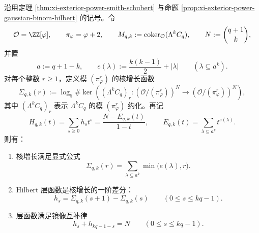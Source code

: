 \begin{theorem}\label{thm:derived-exterior-power-kernel-growth-hilbert-mirror}
沿用定理 \ref{thm:xi-exterior-power-smith-schubert} 与命题 \ref{prop:xi-exterior-power-gaussian-binom-hilbert} 的记号。令
\[
\mathcal O=\ZZ[\varphi],
\qquad
\pi_\varphi=\varphi+2,
\qquad
M_{q,k}:=\operatorname{coker}_{\mathcal O}(\Lambda^k C_q),
\qquad
N:=\binom{q+1}{k},
\]
并置
\[
a:=q+1-k,
\qquad
e(\lambda):=\frac{k(k-1)}{2}+|\lambda|
\qquad
(\lambda\subseteq a^k).
\]
对每个整数 \(r\ge 1\)，定义模 \((\pi_\varphi^r)\) 的核增长函数
\[
\Sigma_{q,k}(r):=
\log_5 \#
\ker\!\left(
(\Lambda^k C_q)_r:(\mathcal O/(\pi_\varphi^r))^N\to (\mathcal O/(\pi_\varphi^r))^N
\right),
\]
其中 \((\Lambda^k C_q)_r\) 表示 \(\Lambda^k C_q\) 的模 \((\pi_\varphi^r)\) 约化。再记
\[
H_{q,k}(t)=\sum_{s\ge 0} h_s t^s
=
\frac{N-E_{q,k}(t)}{1-t},
\qquad
E_{q,k}(t)=\sum_{\lambda\subseteq a^k} t^{e(\lambda)}.
\]
则有：
\begin{enumerate}
  \item 核增长满足显式公式
  \[
  \Sigma_{q,k}(r)=\sum_{\lambda\subseteq a^k}\min\bigl(e(\lambda),r\bigr).
  \]
  \item Hilbert 层函数是核增长的一阶差分：
  \[
  h_s=\Sigma_{q,k}(s+1)-\Sigma_{q,k}(s)
  \qquad (0\le s\le kq-1).
  \]
  \item 层函数满足镜像互补律
  \[
  h_s+h_{kq-1-s}=N
  \qquad (0\le s\le kq-1).
  \]
\end{enumerate}
\end{theorem}
